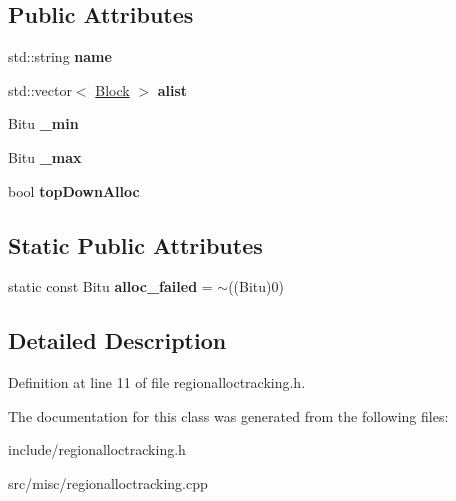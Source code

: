 \subsection*{Public Attributes}
\begin{DoxyCompactItemize}
\item 
\hypertarget{classRegionAllocTracking_a1fcd5cfce8e215f77331e90e220da0f5}{std\-::string {\bfseries name}}\label{classRegionAllocTracking_a1fcd5cfce8e215f77331e90e220da0f5}

\item 
\hypertarget{classRegionAllocTracking_ac06d694e674c27bb3272f56401075d6e}{std\-::vector$<$ \hyperlink{classRegionAllocTracking_1_1Block}{Block} $>$ {\bfseries alist}}\label{classRegionAllocTracking_ac06d694e674c27bb3272f56401075d6e}

\item 
\hypertarget{classRegionAllocTracking_adf0b9d0fc7b2ed4b80fb3084b3b17739}{Bitu {\bfseries \-\_\-min}}\label{classRegionAllocTracking_adf0b9d0fc7b2ed4b80fb3084b3b17739}

\item 
\hypertarget{classRegionAllocTracking_aaf5ecc163636a2c3fa6fdd84358e0df4}{Bitu {\bfseries \-\_\-max}}\label{classRegionAllocTracking_aaf5ecc163636a2c3fa6fdd84358e0df4}

\item 
\hypertarget{classRegionAllocTracking_ae9c6f713758966d53bb1e2dcc5a4aab2}{bool {\bfseries top\-Down\-Alloc}}\label{classRegionAllocTracking_ae9c6f713758966d53bb1e2dcc5a4aab2}

\end{DoxyCompactItemize}
\subsection*{Static Public Attributes}
\begin{DoxyCompactItemize}
\item 
\hypertarget{classRegionAllocTracking_a4763aa8e3a86fab24189802bbe87824d}{static const Bitu {\bfseries alloc\-\_\-failed} = $\sim$((Bitu)0)}\label{classRegionAllocTracking_a4763aa8e3a86fab24189802bbe87824d}

\end{DoxyCompactItemize}


\subsection{Detailed Description}


Definition at line 11 of file regionalloctracking.\-h.



The documentation for this class was generated from the following files\-:\begin{DoxyCompactItemize}
\item 
include/regionalloctracking.\-h\item 
src/misc/regionalloctracking.\-cpp\end{DoxyCompactItemize}
